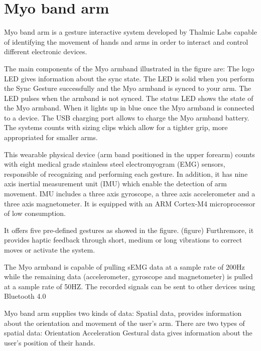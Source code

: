 \section{Myo band arm}

Myo band arm is a gesture interactive system developed by Thalmic Labs capable of identifying the movement of hands and arms in order to interact and control different electronic devices.


The main components of the Myo armband illustrated in the figure %
are:
The logo LED gives information about the sync state. The LED is solid when you perform the Sync Gesture successfully and
the Myo armband is synced to your arm. The LED pulses when the armband is not synced.
The status LED shows the state of the Myo armband. When it lights up in blue once the Myo armband is connected to a device. 
The USB charging port allows to charge the Myo armband battery. 
The systems counts with sizing clips which allow for a tighter grip, more appropriated for smaller arms.

This wearable physical device (arm band positioned in the upper forearm) counts with eight medical grade stainless steel electromyogram (EMG) sensors, responsible of recognizing and performing each gesture. In addition, it has nine axis inertial measurement unit (IMU) which enable the detection of arm movement. IMU includes a three axis gyroscope,  a three axis accelerometer and a three axis magnetometer. It is equipped with an ARM Cortex-M4 microprocessor of low consumption.

It offers five pre-defined gestures as showed in the figure. (figure) Furthremore, it provides haptic feedback through short, medium or long vibrations to correct moves or activate the system.

The Myo armband is capable of pulling sEMG data at a sample rate of 200Hz while the remaining data (accelerometer, gyroscope and magnetometer) is pulled at a sample rate of  50HZ. The recorded signals can be sent to other devices using Bluetooth 4.0 

Myo band arm supplies two kinds of data:
Spatial data, provides information about the orientation and movement of the user's arm. There are two types of spatial data:
Orientation
Acceleration
Gestural data gives information about the user's position of their hands.








